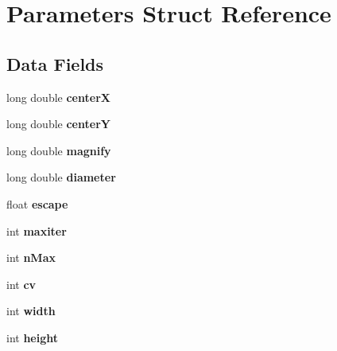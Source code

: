 \hypertarget{struct_parameters}{}\section{Parameters Struct Reference}
\label{struct_parameters}
\subsection*{Data Fields}
\begin{DoxyCompactItemize}
\item 
\mbox{\label{struct_parameters_a77a4b596ca7a32175d60ff750748af21}} 
long double {\bfseries centerX}
\item 
\mbox{\label{struct_parameters_a9f486cabe8205f5c1ee65ecc885e4b86}} 
long double {\bfseries centerY}
\item 
\mbox{\label{struct_parameters_a90f665266505361517c0b1af718b2d4a}} 
long double {\bfseries magnify}
\item 
\mbox{\label{struct_parameters_a039d46f92783f0b6b7d2d1500fdbe0c8}} 
long double {\bfseries diameter}
\item 
\mbox{\label{struct_parameters_ab2c8bc69657e088382736e4a0e11217d}} 
float {\bfseries escape}
\item 
\mbox{\label{struct_parameters_ac52eab28b83153725ee22ba6700f848e}} 
int {\bfseries maxiter}
\item 
\mbox{\label{struct_parameters_a2e909688b271cc9c2bdb3d0cc9c34269}} 
int {\bfseries n\+Max}
\item 
\mbox{\label{struct_parameters_a47505a58a58119e1de3adf8b84e8a33e}} 
int {\bfseries cv}
\item 
\mbox{\label{struct_parameters_ae8f341732b04b09c84f67f0439efb79d}} 
int {\bfseries width}
\item 
\mbox{\label{struct_parameters_aa0985d56460f9fd14ab4696c0ddcd700}} 
int {\bfseries height}

\end{DoxyCompactItemize}

